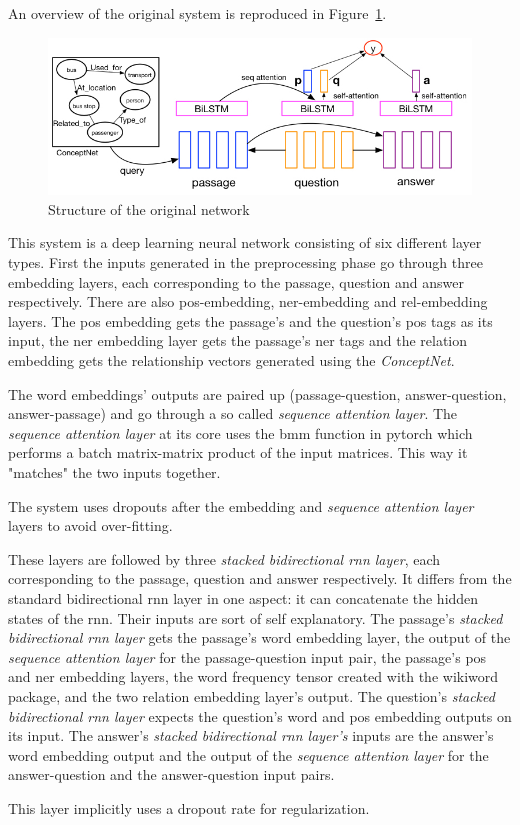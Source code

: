 An overview of the original system is reproduced in Figure~\ref{fig:dnn}.
\begin{figure}
	\centering
	\includegraphics[scale=0.5]{TriAN.jpg}
	\caption{Structure of the original network \cite[p.2]{Wang:2018}}
	\label{fig:dnn}
\end{figure}
This system is a deep learning neural network consisting of six different layer types. First the inputs generated in the preprocessing phase go through three embedding layers, each corresponding to the passage, question and answer respectively. There are also pos-embedding, ner-embedding and rel-embedding layers. The pos embedding gets the passage's and the question's pos tags as its input, the ner embedding layer gets the passage's ner tags and the relation embedding gets the relationship vectors generated using the \textit{ConceptNet}.

The word embeddings' outputs are paired up (passage-question, answer-question, answer-passage) and go through a so called \textit{sequence attention layer}. The \textit{sequence attention layer} at its core uses the bmm function in pytorch which performs a batch matrix-matrix product of the input matrices. This way it "matches" the two inputs together.

The system uses dropouts after the embedding and \textit{sequence attention layer} layers to avoid over-fitting.

These layers are followed by three \textit{stacked bidirectional rnn layer}, each corresponding to the passage, question and answer respectively. It differs from the standard bidirectional rnn layer in one aspect: it can concatenate the hidden states of the rnn. Their inputs are sort of self explanatory. The passage's \textit{stacked bidirectional rnn layer} gets the passage's word embedding layer, the output of the \textit{sequence attention layer} for the passage-question input pair, the passage's pos and ner embedding layers, the word frequency tensor created with the wikiword package, and the two relation embedding layer's output. The question's \textit{stacked bidirectional rnn layer} expects the question's word and pos embedding outputs on its input. The answer's \textit{stacked bidirectional rnn layer's} inputs are the answer's word embedding output and  the output of the \textit{sequence attention layer} for the answer-question and the answer-question input pairs.

This layer implicitly uses a dropout rate for regularization.

